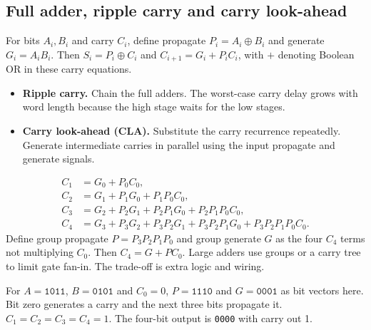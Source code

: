 \documentclass[12pt,a4paper]{article}
\begin{document}
\subsection{Full adder, ripple carry and carry look-ahead}
For bits $A_i,B_i$ and carry $C_i$, define propagate $P_i=A_i\oplus B_i$ and generate $G_i=A_iB_i$. Then $S_i=P_i\oplus C_i$ and $C_{i+1}=G_i+P_i C_i$, with $+$ denoting Boolean OR in these carry equations.
\begin{itemize}[leftmargin=*,itemsep=3pt]
\item \textbf{Ripple carry.} Chain the full adders. The worst-case carry delay grows with word length because the high stage waits for the low stages.
\item \textbf{Carry look-ahead (CLA).} Substitute the carry recurrence repeatedly. Generate intermediate carries in parallel using the input propagate and generate signals.
\end{itemize}
\[
\begin{aligned}
 C_1&=G_0+P_0C_0,\\
 C_2&=G_1+P_1G_0+P_1P_0C_0,\\
 C_3&=G_2+P_2G_1+P_2P_1G_0+P_2P_1P_0C_0,\\
 C_4&=G_3+P_3G_2+P_3P_2G_1+P_3P_2P_1G_0+P_3P_2P_1P_0C_0 .
\end{aligned}
\]
Define group propagate $P=P_3P_2P_1P_0$ and group generate $G$ as the four $C_4$ terms not multiplying $C_0$. Then $C_4=G+PC_0$. Large adders use groups or a carry tree to limit gate fan-in. The trade-off is extra logic and wiring.
\begin{tcolorbox}[examplebox,title={Trace a carry through a CLA group}]
For $A=\texttt{1011}$, $B=\texttt{0101}$ and $C_0=0$, $P=\texttt{1110}$ and $G=\texttt{0001}$ as bit vectors here. Bit zero generates a carry and the next three bits propagate it. $C_1=C_2=C_3=C_4=1$. The four-bit output is \texttt{0000} with carry out 1.
\end{tcolorbox}
\end{document}

